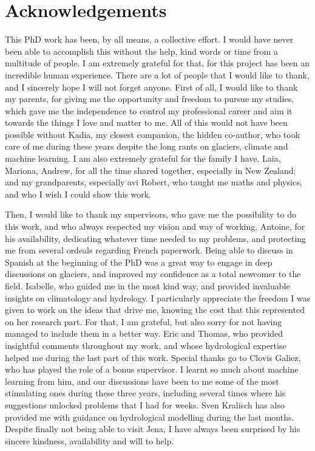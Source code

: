 \section*{Acknowledgements}

This PhD work has been, by all means, a collective effort. I would have never been able to accomplish this without the help, kind words or time from a multitude of people. I am extremely grateful for that, for this project has been an incredible human experience. There are a lot of people that I would like to thank, and I sincerely hope I will not forget anyone. First of all, I would like to thank my parents, for giving me the opportunity and freedom to pursue my studies, which gave me the independence to control my professional career and aim it towards the things I love and matter to me. All of this would not have been possible without Kadia, my closest companion, the hidden co-author, who took care of me during these years despite the long rants on glaciers, climate and machine learning. I am also extremely grateful for the family I have. Laia, Mariona, Andrew, for all the time shared together, especially in New Zealand; and my grandparents, especially avi Robert, who taught me maths and physics, and who I wish I could show this work. 

Then, I would like to thank my supervisors, who gave me the possibility to do this work, and who always respected my vision and way of working. Antoine, for his availability, dedicating whatever time needed to my problems, and protecting me from several ordeals regarding French paperwork. Being able to discuss in Spanish at the beginning of the PhD was a great way to engage in deep discussions on glaciers, and improved my confidence as a total newcomer to the field. Isabelle, who guided me in the most kind way, and provided invaluable insights on climatology and hydrology. I particularly appreciate the freedom I was given to work on the ideas that drive me, knowing the cost that this represented on her research part. For that, I am grateful, but also sorry for not having managed to include them in a better way. Eric and Thomas, who provided insightful comments throughout my work, and whose hydrological expertise helped me during the last part of this work. Special thanks go to Clovis Galiez, who has played the role of a bonus supervisor. I learnt so much about machine learning from him, and our discussions have been to me some of the most stimulating ones during these three years, including several times where his suggestions unlocked problems that I had for weeks. Sven Kralisch has also provided me with guidance on hydrological modelling during the last months. Despite finally not being able to visit Jena, I have always been surprised by his sincere kindness, availability and will to help. 

